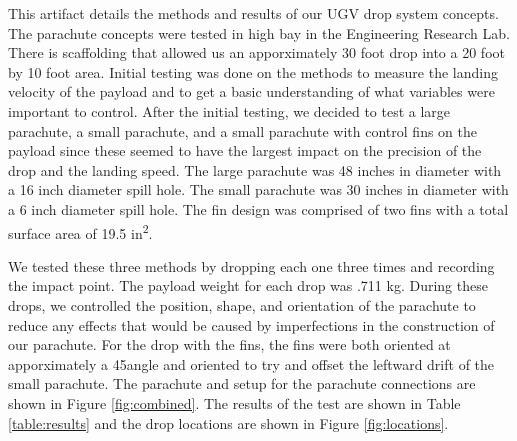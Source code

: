 \documentclass[]{auvsi_doc}
\begin{document}
\begin{AUVSITitlePage}
\begin{artifacttable}
\end{artifacttable}
\end{AUVSITitlePage}

This artifact details the methods and results of our UGV drop system concepts. The parachute concepts were tested in high bay in the Engineering Research Lab. There is scaffolding that allowed us an apporximately 30 foot drop into a 20 foot by 10 foot area. Initial testing was done on the methods to measure the landing velocity of the payload and to get a basic understanding of what variables were important to control. After the initial testing, we decided to test a large parachute, a small parachute, and a small parachute with control fins on the payload since these seemed to have the largest impact on the precision of the drop and the landing speed. The large parachute was 48 inches in diameter with a 16 inch diameter spill hole. The small parachute was 30 inches in diameter with a 6 inch diameter spill hole. The fin design was comprised of two fins with a total surface area of 19.5 in\textsuperscript{2}.

We tested these three methods by dropping each one three times and recording the impact point. The payload weight for each drop was .711 kg.  During these drops, we controlled the position, shape, and orientation of the parachute to reduce any effects that would be caused by imperfections in the construction of our parachute. For the drop with the fins, the fins were both oriented at apporximately a 45\degree angle and oriented to try and offset the leftward drift of the small parachute. The parachute and setup for the parachute connections are shown in Figure \ref{fig:combined}. The results of the test are shown in Table \ref{table:results} and the drop locations are shown in Figure \ref{fig:locations}. 
\end{document}
